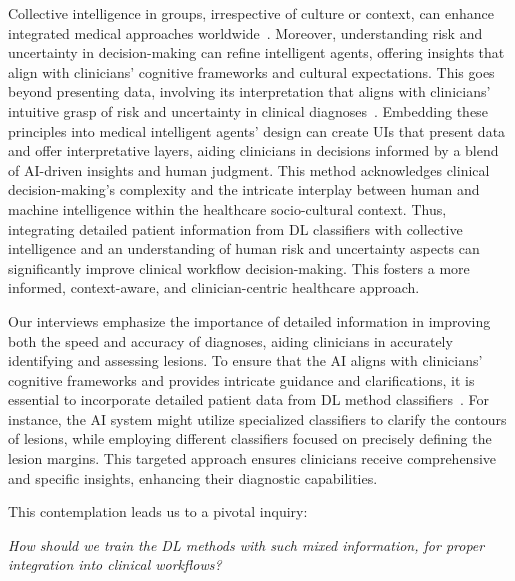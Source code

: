 \textcolor{revised}{Collective intelligence in groups, irrespective of culture or context, can enhance integrated medical approaches worldwide~\cite{10.1093/jamia/ocab291, Sollini2020}.
Moreover, understanding risk and uncertainty in decision-making can refine intelligent agents, offering insights that align with clinicians' cognitive frameworks and cultural expectations.
This goes beyond presenting data, involving its interpretation that aligns with clinicians' intuitive grasp of risk and uncertainty in clinical diagnoses~\cite{10.1145/3544548.3581075, 10.1145/3313831.3376506}.
Embedding these principles into medical intelligent agents' design can create \acp{UI} that present data and offer interpretative layers, aiding clinicians in decisions informed by a blend of \acs{AI}-driven insights and human judgment.
This method acknowledges clinical decision-making's complexity and the intricate interplay between human and machine intelligence within the healthcare socio-cultural context.
Thus, integrating detailed patient information from \ac{DL} classifiers with collective intelligence and an understanding of human risk and uncertainty aspects can significantly improve clinical workflow decision-making.
This fosters a more informed, context-aware, and clinician-centric healthcare approach.}

\textcolor{revised}{Our interviews emphasize the importance of detailed information in improving both the speed and accuracy of diagnoses, aiding clinicians in accurately identifying and assessing lesions.
To ensure that the \ac{AI} aligns with clinicians' cognitive frameworks and provides intricate guidance and clarifications, it is essential to incorporate detailed patient data from \ac{DL} method classifiers~\cite{doi:10.1148/ryai.210299}.
For instance, the \ac{AI} system might utilize specialized classifiers to clarify the contours of lesions, while employing different classifiers focused on precisely defining the lesion margins.
This targeted approach ensures clinicians receive comprehensive and specific insights, enhancing their diagnostic capabilities.}

\vspace{2.50mm}

\noindent
\textcolor{revised}{This contemplation leads us to a pivotal inquiry:}

\vspace{1.00mm}

\noindent
{\it How should we train the \ac{DL} methods with such mixed information, for proper integration into clinical workflows?}

